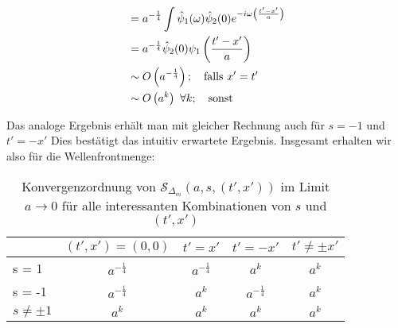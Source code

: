 \begin{align}
 &= a^{-\frac{1}{4}} \int \hat \psi_1(\omega) \hat \psi_2 (0)
    e^{-i\omega \left(\frac{t'-x'}{a}\right)} \nonumber \\
&= a^{-\frac{1}{4}} \hat \psi_2 (0) \psi_1\left(\frac{t'-x'}{a}\right) \nonumber \\
& \sim O\left(a^{-\frac{1}{4}}\right); \textrm{\kern  1em falls } x' = t' \nonumber \\
& \sim O\left(a^k\right) ~ \forall k ;\textrm{\kern  1em sonst} \nonumber
\end{align}

Das analoge Ergebnis erhält man mit gleicher Rechnung auch für $s=-1$ und $t' = -x'$
Dies bestätigt das intuitiv erwartete Ergebnis. Insgesamt erhalten wir also für die Wellenfrontmenge:

\begin{table}[h]
\centering
\label{my-label}
\begin{tabular}{l|cccc}
        & \multicolumn{1}{l}{$(t', x') = (0, 0)$} & \multicolumn{1}{l}{$t' = x'$} & \multicolumn{1}{l}{$t' = -x'$} & \multicolumn{1}{l}{$t' \neq \pm x'$} \\ \hline
s = 1   & $a^{-\frac{1}{4}}$    & $a^{-\frac{1}{4}}$    & $a^k$  & $a^k$    \\
s = -1  & $a^{-\frac{1}{4}}$    & $a^k$    & $a^{-\frac{1}{4}}$  & $a^k$    \\
$s \neq \pm 1$  & $a^k$         & $a^k$    & $a^k$               & $a^k$    \\
\end{tabular}
\caption{Konvergenzordnung von $\mathcal{S}_{\Delta_m} (a,s,(t',x'))$ im Limit $a \rightarrow 0$ für alle interessanten Kombinationen von $s$ und $(t',x')$}
\end{table}

